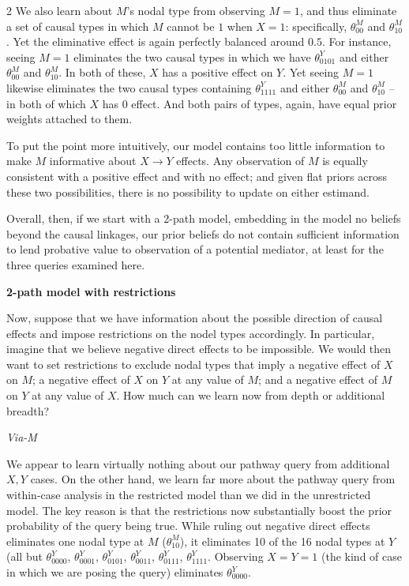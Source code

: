 \documentclass[
  12pt,
]{book}
\begin{document}
2 We also learn about \(M\)'s nodal type from observing \(M=1\), and thus eliminate a set of causal types in which \(M\) cannot be \(1\) when \(X=1\): specifically, \(\theta^M_{00}\) and \(\theta^M_{10}\). Yet the eliminative effect is again perfectly balanced around \(0.5\). For instance, seeing \(M=1\) eliminates the two causal types in which we have \(\theta^Y_{0101}\) and either \(\theta^M_{00}\) and \(\theta^M_{10}\). In both of these, \(X\) has a positive effect on \(Y\). Yet seeing \(M=1\) likewise eliminates the two causal types containing \(\theta^Y_{1111}\) and either \(\theta^M_{00}\) and \(\theta^M_{10}\) -- in both of which \(X\) has \(0\) effect. And both pairs of types, again, have equal prior weights attached to them.

To put the point more intuitively, our model contains too little information to make \(M\) informative about \(X \rightarrow Y\) effects. Any observation of \(M\) is equally consistent with a positive effect and with no effect; and given flat priors across these two possibilities, there is no possibility to update on either estimand.

Overall, then, if we start with a 2-path model, embedding in the model no beliefs beyond the causal linkages, our prior beliefs do not contain sufficient information to lend probative value to observation of a potential mediator, at least for the three queries examined here.

\textbf{2-path model with restrictions}

Now, suppose that we have information about the possible direction of causal effects and impose restrictions on the nodel types accordingly. In particular, imagine that we believe negative direct effects to be impossible. We would then want to set restrictions to exclude nodal types that imply a negative effect of \(X\) on \(M\); a negative effect of \(X\) on \(Y\) at any value of \(M\); and a negative effect of \(M\) on \(Y\) at any value of \(X\). How much can we learn now from depth or additional breadth?

\emph{Via-M}

We appear to learn virtually nothing about our pathway query from additional \(X, Y\) cases. On the other hand, we learn far more about the pathway query from within-case analysis in the restricted model than we did in the unrestricted model. The key reason is that the restrictions now substantially boost the prior probability of the query being true. While ruling out negative direct effects eliminates one nodal type at \(M\) (\(\theta^M_{10}\)), it eliminates 10 of the 16 nodal types at \(Y\) (all but \(\theta^Y_{0000}\), \(\theta^Y_{0001}\), \(\theta^Y_{0101}\), \(\theta^Y_{0011}\), \(\theta^Y_{0111}\), \(\theta^Y_{1111}\). Observing \(X=Y=1\) (the kind of case in which we are posing the query) eliminates \(\theta^Y_{0000}\).
\end{document}
